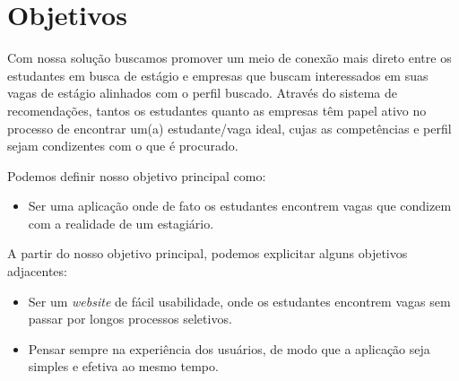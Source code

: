 \section{Objetivos}
Com nossa solução buscamos promover um meio de conexão mais direto entre os estudantes em busca de estágio e empresas que buscam interessados em suas vagas de estágio alinhados com o perfil buscado. Através do sistema de recomendações, tantos os estudantes quanto as empresas têm papel ativo no processo de encontrar um(a) estudante/vaga ideal, cujas as competências e perfil sejam condizentes com o que é procurado.

Podemos definir nosso objetivo principal como:
\begin{itemize}
		\item Ser uma aplicação onde de fato os estudantes encontrem vagas que condizem com a realidade de um estagiário.
\end{itemize}

A partir do nosso objetivo principal, podemos explicitar alguns objetivos adjacentes:

\begin{itemize}
	\item Ser um \emph{website} de fácil usabilidade, onde os estudantes encontrem vagas sem passar por longos processos seletivos.
	\item Pensar sempre na experiência dos usuários, de modo que a aplicação seja simples e efetiva ao mesmo tempo.
\end{itemize}